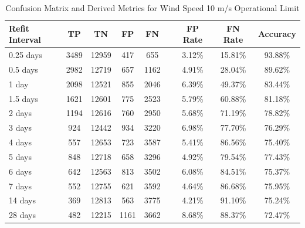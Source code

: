 \begin{table}[ht!]
    \centering
    \caption{Confusion Matrix and Derived Metrics for Wind Speed 10 m/s Operational Limit}
    \label{tab:wind_speed_10}
    \begin{tabular}{|l|c|c|c|c|c|c|c|c|}
        \hline
        \textbf{Refit Interval} & \textbf{TP} & \textbf{TN} & \textbf{FP} & \textbf{FN} && \textbf{FP Rate} & \textbf{FN Rate} & \textbf{Accuracy} \\
        \hline
        0.25 days & 3489 & 12959 & 417  & 655  && 3.12\%  & 15.81\% & 93.88\% \\
        0.5 days  & 2982 & 12719 & 657  & 1162 && 4.91\%  & 28.04\% & 89.62\% \\
        1 day     & 2098 & 12521 & 855  & 2046 && 6.39\%  & 49.37\% & 83.44\% \\
        1.5 days  & 1621 & 12601 & 775  & 2523 && 5.79\%  & 60.88\% & 81.18\% \\
        2 days    & 1194 & 12616 & 760  & 2950 && 5.68\%  & 71.19\% & 78.82\% \\
        3 days    & 924  & 12442 & 934  & 3220 && 6.98\%  & 77.70\% & 76.29\% \\
        4 days    & 557  & 12653 & 723  & 3587 && 5.41\%  & 86.56\% & 75.40\% \\
        5 days    & 848  & 12718 & 658  & 3296 && 4.92\%  & 79.54\% & 77.43\% \\
        6 days    & 642  & 12563 & 813  & 3502 && 6.08\%  & 84.51\% & 75.37\% \\
        7 days    & 552  & 12755 & 621  & 3592 && 4.64\%  & 86.68\% & 75.95\% \\
        14 days   & 369  & 12813 & 563  & 3775 && 4.21\%  & 91.10\% & 75.24\% \\
        28 days   & 482  & 12215 & 1161 & 3662 && 8.68\%  & 88.37\% & 72.47\% \\
        \hline
    \end{tabular}
\end{table}

